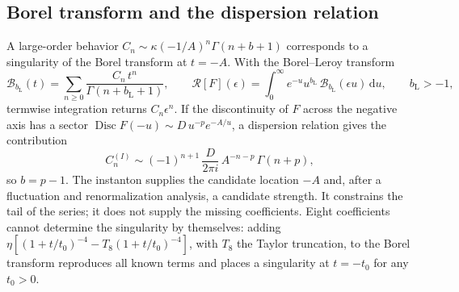 \documentclass[11pt,a4paper]{article}
\numberwithin{equation}{section}
\newcommand{\dd}{\,\mathrm d}
\newcommand{\bL}{b_{\mathrm L}}
\newcommand{\cB}{\mathcal B}
\newcommand{\cR}{\mathcal R}
\newcommand{\Disc}{\operatorname{Disc}}
\begin{document}
\subsection{Borel transform and the dispersion relation}
A large-order behavior $C_n\sim\kappa(-1/A)^n\Gamma(n+b+1)$ corresponds to a singularity
of the Borel transform at $t=-A$. With the Borel--Leroy transform
\begin{equation}
 \cB_{\bL}(t)=\sum_{n\ge0}\frac{C_n\,t^n}{\Gamma(n+\bL+1)},\qquad
 \cR[F](\epsilon)=\int_0^\infty e^{-u}u^{\bL}\,\cB_{\bL}(\epsilon u)\dd u,
 \qquad \bL>-1,
 \label{eq:borel}
\end{equation}
termwise integration returns $C_n\epsilon^n$. If the discontinuity of $F$ across the
negative axis has a sector $\Disc F(-u)\sim D\,u^{-p}e^{-A/u}$, a dispersion relation
gives the contribution
\begin{equation}
 C_n^{(I)}\sim(-1)^{n+1}\,\frac{D}{2\pi i}\,A^{-n-p}\,\Gamma(n+p),
 \label{eq:dispersion}
\end{equation}
so $b=p-1$. The instanton supplies the candidate location $-A$ and, after a fluctuation and
renormalization analysis, a candidate strength. It constrains the tail of the series; it
does not supply the missing coefficients. Eight coefficients cannot determine the
singularity by themselves: adding $\eta[(1+t/t_0)^{-4}-T_8(1+t/t_0)^{-4}]$, with $T_8$
the Taylor truncation, to the Borel transform reproduces all known terms and places a
singularity at $t=-t_0$ for any $t_0>0$.
\end{document}
